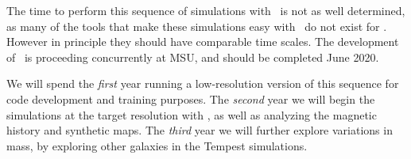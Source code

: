 The time to
perform this sequence of simulations with \enzoe\ is not as well determined, as
many of the tools that make these simulations easy with \enzo\ do not exist for
\enzoe.  However in principle they should have comparable time scales.
The development of \enzoe\ is proceeding concurrently at MSU, and
should be completed June 2020.

We will spend the \emph{first} year running a low-resolution version of this sequence
for code development and training purposes.  The \emph{second} year we will begin the
simulations at the target resolution with \enzoe, as well as analyzing the
magnetic history and synthetic maps.  The \emph{third} year we will further explore
variations in mass, by exploring other galaxies in the Tempest simulations.

